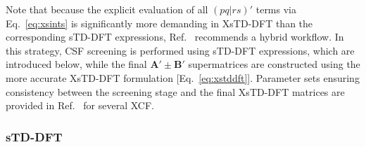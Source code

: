 \documentclass[%
 aip,
 amsmath,amssymb,
preprint,%
]{revtex4-2}
\begin{document}

Note that because the explicit evaluation of all $(pq|rs)'$ terms via Eq.~\eqref{eq:xsints} is significantly more demanding in XsTD-DFT than the corresponding sTD-DFT expressions, Ref.~ recommends a hybrid workflow.  
In this strategy, CSF screening is performed using sTD-DFT expressions, which are introduced below, while the final $\mathbf{A}'\pm\mathbf{B}'$ supermatrices are constructed using the more accurate XsTD-DFT formulation [Eq.~\eqref{eq:xstddft}].  
Parameter sets ensuring consistency between the screening stage and the final XsTD-DFT matrices are provided in Ref.~ for several XCF.

\subsubsection{sTD-DFT}
\end{document}
